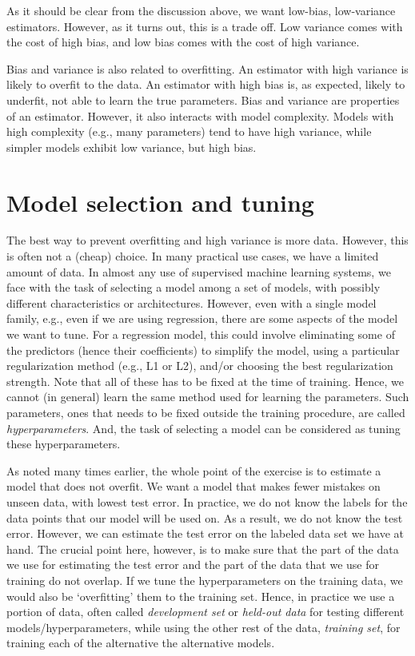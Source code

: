 As it should be clear from the discussion above,
we want low-bias, low-variance estimators.
However, as it turns out, this is a trade off.
Low variance comes with the cost of high bias,
and low bias comes with the cost of high variance.

Bias and variance is also related to overfitting.
An estimator with high variance is likely to overfit to the data.
An estimator with high bias is, as expected, likely to underfit,
not able to learn the true parameters.
Bias and variance are  properties of an estimator.
However, it also interacts with model complexity.
Models with high complexity (e.g., many parameters) tend to have high variance,
while simpler models exhibit low variance, but high bias.

\section{Model selection and tuning}

The best way to prevent overfitting and high variance is more data.
However, this is often not a (cheap) choice.
In many practical use cases, we have a limited amount of data.
In almost any use of supervised machine learning systems,
we face with the task of selecting a model among a set of models,
with possibly different characteristics or architectures.
However, even with a single model family,
e.g., even if we are using regression,
there are some aspects of the model we want to tune.
For a regression model,
this could involve eliminating some of the predictors
(hence their coefficients) to simplify the model,
using a particular regularization method (e.g., L1 or L2),
and/or choosing the best regularization strength.
Note that all of these has to be fixed at the time of training.
Hence, we cannot (in general) learn the same method used
for learning the parameters.
Such parameters, ones that needs to be fixed outside the training procedure,
are called \emph{hyperparameters}.
And, the task of selecting a model can be considered
as tuning these hyperparameters.

As noted many times earlier,
the whole point of the exercise is to estimate a model that does not overfit.
We want a model that makes fewer mistakes on unseen data,
with lowest test error.
In practice,
we do not know the labels for the data points that our model will be used on.
As a result, we do not know the test error.
However, we can estimate the test error on the labeled data set we have at hand.
The crucial point here, however,
is to make sure that the part of the data we use for estimating the test error
and the part of the data that we use for training do not overlap.
If we tune the hyperparameters on the training data,
we would also be `overfitting' them to the training set.
Hence, in practice we use a portion of data,
often called \emph{development set} or \emph{held-out data} for testing
different models/hyperparameters,
while using the other rest of the data, \emph{training set},
for training each of the alternative the alternative models.

